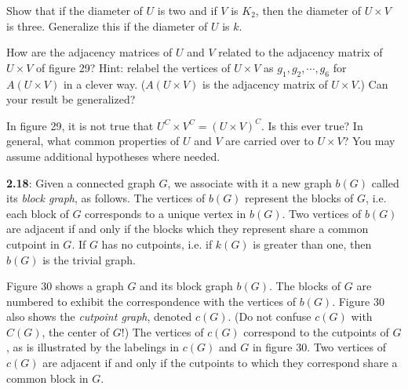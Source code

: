 \documentclass{article}
\begin{document}
Show that if the diameter of $U$ is two and if $V$ is $K_2$, then the diameter of $U \times V$ is three. Generalize this if the diameter of $U$ is $k$.

How are the adjacency matrices of $U$ and $V$ related to the adjacency matrix of $U \times V$ of figure 29? Hint: relabel the vertices of $U \times V$ as $g_1, g_2, \cdots, g_6$ for $A(U \times V)$ in a clever way. ($A(U \times V)$ is the adjacency matrix of $U \times V$.) Can your result be generalized?

In figure 29, it is not true that $U^C \times V^C = (U \times V)^C$. Is this ever true? In general, what common properties of $U$ and $V$ are carried over to $U \times V$? You may assume additional hypotheses where needed.

\vspace{0.5cm}

\textbf{2.18}: Given a connected graph $G$, we associate with it a new graph $b(G)$ called its \emph{block graph}, as follows. The vertices of $b(G)$ represent the blocks of $G$, i.e. each block of $G$ corresponds to a unique vertex in $b(G)$. Two vertices of $b(G)$ are adjacent if and only if the blocks which they represent share a common cutpoint in $G$. If $G$ has no cutpoints, i.e. if $k(G)$ is greater than one, then $b(G)$ is the trivial graph.

Figure 30 shows a graph $G$ and its block graph $b(G)$. The blocks of $G$ are numbered to exhibit the correspondence with the vertices of $b(G)$. Figure 30 also shows the \emph{cutpoint graph}, denoted $c(G)$. (Do not confuse $c(G)$ with $C(G)$, the center of $G$!) The vertices of $c(G)$ correspond to the cutpoints of $G$, as is illustrated by the labelings in $c(G)$ and $G$ in figure 30. Two vertices of $c(G)$ are adjacent if and only if the cutpoints to which they correspond share a common block in $G$.
\end{document}
